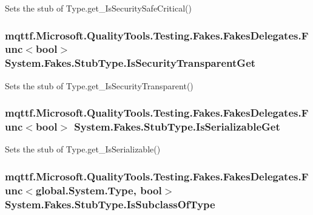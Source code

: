 Sets the stub of Type.\-get\-\_\-\-Is\-Security\-Safe\-Critical()

\hypertarget{class_system_1_1_fakes_1_1_stub_type_a37906fcbfc1ddf051cb47668b1f45320}{
\subsubsection[{Is\-Security\-Transparent\-Get}]{\setlength{\rightskip}{0pt plus 5cm}mqttf.\-Microsoft.\-Quality\-Tools.\-Testing.\-Fakes.\-Fakes\-Delegates.\-Func$<$bool$>$ System.\-Fakes.\-Stub\-Type.\-Is\-Security\-Transparent\-Get}}\label{class_system_1_1_fakes_1_1_stub_type_a37906fcbfc1ddf051cb47668b1f45320}


Sets the stub of Type.\-get\-\_\-\-Is\-Security\-Transparent()

\hypertarget{class_system_1_1_fakes_1_1_stub_type_aa25b9a8081a0ae73112987dc20361049}{
\subsubsection[{Is\-Serializable\-Get}]{\setlength{\rightskip}{0pt plus 5cm}mqttf.\-Microsoft.\-Quality\-Tools.\-Testing.\-Fakes.\-Fakes\-Delegates.\-Func$<$bool$>$ System.\-Fakes.\-Stub\-Type.\-Is\-Serializable\-Get}}\label{class_system_1_1_fakes_1_1_stub_type_aa25b9a8081a0ae73112987dc20361049}


Sets the stub of Type.\-get\-\_\-\-Is\-Serializable()

\hypertarget{class_system_1_1_fakes_1_1_stub_type_a727d9cbbd29ff28904458073fc9fdf7e}{
\subsubsection[{Is\-Subclass\-Of\-Type}]{\setlength{\rightskip}{0pt plus 5cm}mqttf.\-Microsoft.\-Quality\-Tools.\-Testing.\-Fakes.\-Fakes\-Delegates.\-Func$<$global.\-System.\-Type, bool$>$ System.\-Fakes.\-Stub\-Type.\-Is\-Subclass\-Of\-Type}}\label{class_system_1_1_fakes_1_1_stub_type_a727d9cbbd29ff28904458073fc9fdf7e}


